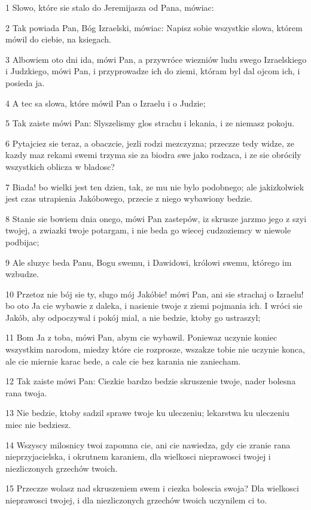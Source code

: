 \par 1 Slowo, które sie stalo do Jeremijasza od Pana, mówiac:
\par 2 Tak powiada Pan, Bóg Izraelski, mówiac: Napisz sobie wszystkie slowa, którem mówil do ciebie, na ksiegach.
\par 3 Albowiem oto dni ida, mówi Pan, a przywróce wiezniów ludu swego Izraelskiego i Judzkiego, mówi Pan, i przyprowadze ich do ziemi, któram byl dal ojcom ich, i posieda ja.
\par 4 A tec sa slowa, które mówil Pan o Izraelu i o Judzie;
\par 5 Tak zaiste mówi Pan: Slyszelismy glos strachu i lekania, i ze niemasz pokoju.
\par 6 Pytajciez sie teraz, a obaczcie, jezli rodzi mezczyzna; przeczze tedy widze, ze kazdy maz rekami swemi trzyma sie za biodra swe jako rodzaca, i ze sie obrócily wszystkich oblicza w bladosc?
\par 7 Biada! bo wielki jest ten dzien, tak, ze mu nie bylo podobnego; ale jakizkolwiek jest czas utrapienia Jakóbowego, przecie z niego wybawiony bedzie.
\par 8 Stanie sie bowiem dnia onego, mówi Pan zastepów, iz skrusze jarzmo jego z szyi twojej, a zwiazki twoje potargam, i nie beda go wiecej cudzoziemcy w niewole podbijac;
\par 9 Ale sluzyc beda Panu, Bogu swemu, i Dawidowi, królowi swemu, którego im wzbudze.
\par 10 Przetoz nie bój sie ty, slugo mój Jakóbie! mówi Pan, ani sie strachaj o Izraelu! bo oto Ja cie wybawie z daleka, i nasienie twoje z ziemi pojmania ich. I wróci sie Jakób, aby odpoczywal i pokój mial, a nie bedzie, ktoby go ustraszyl;
\par 11 Bom Ja z toba, mówi Pan, abym cie wybawil. Poniewaz uczynie koniec wszystkim narodom, miedzy które cie rozprosze, wszakze tobie nie uczynie konca, ale cie miernie karac bede, a cale cie bez karania nie zaniecham.
\par 12 Tak zaiste mówi Pan: Ciezkie bardzo bedzie skruszenie twoje, nader bolesna rana twoja.
\par 13 Nie bedzie, ktoby sadzil sprawe twoje ku uleczeniu; lekarstwa ku uleczeniu miec nie bedziesz.
\par 14 Wszyscy milosnicy twoi zapomna cie, ani cie nawiedza, gdy cie zranie rana nieprzyjacielska, i okrutnem karaniem, dla wielkosci nieprawosci twojej i niezliczonych grzechów twoich.
\par 15 Przeczze wolasz nad skruszeniem swem i ciezka bolescia swoja? Dla wielkosci nieprawosci twojej, i dla niezliczonych grzechów twoich uczynilem ci to.
